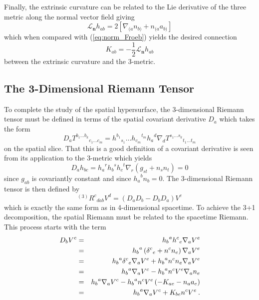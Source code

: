 Finally, the extrinsic curvature can be related to the Lie derivative of the
three metric along the normal vector field giving
\[
   {\mathcal L}_{\mathbf{n}} h_{ab} = 2 \left[ \nabla_{(a} n_{b)} + n_{(a}a_{b)} \right]
\]
which when compared with (\ref{eq:norm_Froeb}) yields the desired connection
\begin{equation}\label{eq:Lie_K}
   K_{ab} = - \frac{1}{2} {\mathcal L}_{\mathbf{n}} h_{ab}
\end{equation}
between the extrinsic curvature and the 3-metric.


\subsection{The 3-Dimensional Riemann Tensor}
To complete the study of the spatial hypersurface, the 3-dimensional Riemann
tensor must be defined in terms of the spatial covariant derivative $D_a$ which
takes the form
\[
   D_a {T^{b_1 \ldots b_k}}_{c_1 \ldots c_m} = {h^{b_1}}_{s_1}
                                               \ldots {h_{c_m}}^{t_m} {h_a}^{d}
                                               \nabla_d
                                               {T^{s_1 \ldots s_k}}_{t_1 \ldots t_m}
\]
on the spatial slice.  That this is a good definition of a covariant derivative
is seen from its application to the 3-metric which yields
\[
   D_a h_{bc} = {h_a}^{r} {h_b}^s {h_c}^t \nabla_r
                \left( g_{st} + n_s n_t \right) = 0
\]
since $g_{ab}$ is covariantly constant and since ${h_a}^b n_b = 0$.  The
3-dimensional Riemann tensor is then defined by
\begin{equation}\label{eq:3_d_Riemann}
   {}^{(3)}{R^c}_{dab} V^d = \left( D_{a}D_{b} - D_{b}D_{a} \right) V^c
\end{equation}
which is exactly the same form as in 4-dimensional spacetime.  To achieve the
3+1 decomposition, the spatial Riemann must be related to the spacetime Riemann.
This process starts with the term
\begin{eqnarray*}
D_b V^c & = & {h_b}^a {h^c}_e \nabla _a V^e \\
        & = & {h_b}^a \left( {\delta ^c}_e + n^c n_e  \right) \nabla _a V^e \\
        & = & {h_b}^a {\delta ^c}_e \nabla _a V^e + {h_b}^a n^c n_e \nabla _a V^e \\
        & = & {h_b}^a \nabla _a V^c - {h_b}^a n^c V^e \nabla _a n_e \\
        & = & {h_b}^a \nabla _a V^c - {h_b}^a n^c V^e
              \left( -K_{ae} - n_a a_e \right) \\
        & = & {h_b}^a \nabla _a V^c + K_{be} n^c V^e \: .
\end{eqnarray*}
